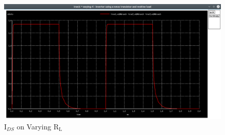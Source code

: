 \documentclass[12pt, a4paper]{article}
\begin{document}
	\begin{figure}[H]
		\begin{center}
			\includegraphics[scale=0.25]{images/inverter_Rl_vdd.png}
			\caption{$\text{I}_{DS}$ on Varying $\text{R}_\text{L}$}
			\label{fig::varying_rl_vdd}
		\end{center}
	\end{figure}
	
\end{document}
